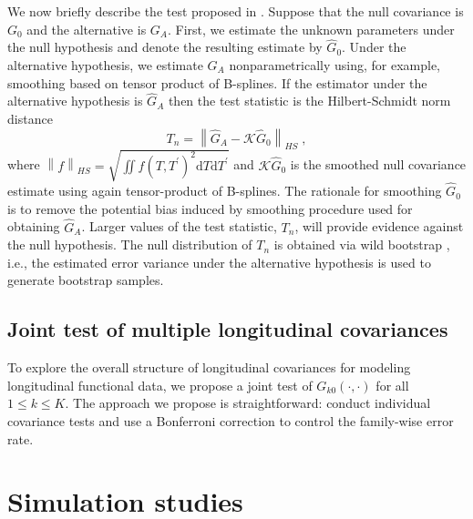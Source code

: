 \documentclass[submit]{smj}
\begin{document}
We now briefly describe the test proposed in \citet{Chen2019}. Suppose that the null covariance is $G_0$ and the alternative is $G_A$.
First, we estimate the unknown parameters under the null hypothesis and denote the resulting estimate by $\widehat{G}_0$.
Under the alternative hypothesis, we estimate $G_A$ nonparametrically using, for example, smoothing based on  tensor product of B-splines. If the estimator under the alternative hypothesis is $\widehat{G}_A$ then the test statistic is the Hilbert-Schmidt norm distance
\begin{equation*}
T_n = \left\|\widehat{G}_A - \mathcal{K} \widehat{G}_0\right\|_{HS}\;,
\end{equation*}
where $\left\|f\right\|_{HS}=\sqrt{\iint f(T,T^{\prime})^2\mathrm{d}T \mathrm{d}T^{\prime}}$ and $\mathcal{K}\widehat{G}_0$ is the smoothed null covariance estimate using again tensor-product of B-splines. The rationale for  smoothing $\widehat{G}_0$ is to remove the potential bias induced by smoothing procedure used for obtaining $\widehat{G}_A$.  Larger values of the test statistic, $T_n$, will provide evidence against the null hypothesis.  The null distribution of $T_n$ is obtained via wild bootstrap \citep{Wu1986}, i.e., the estimated error variance under the alternative hypothesis is used to generate bootstrap samples.


\subsection{Joint test of multiple longitudinal covariances}

To explore the overall structure of longitudinal covariances for modeling  longitudinal functional data, we propose a joint test of $G_{k0}(\cdot,\cdot)$ for all $1 \leq k \leq K$. The approach we propose is straightforward: conduct individual covariance tests and use a Bonferroni correction to control the family-wise error rate.


\section{Simulation studies} \label{sec:simulations} 
\end{document}

